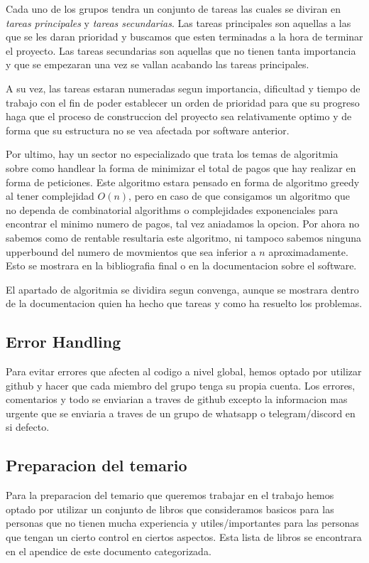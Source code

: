 \documentclass{article}
\theoremstyle{definition}
\begin{document}
Cada uno de los grupos tendra un conjunto de tareas las cuales se diviran en \textit{tareas principales} y \textit{tareas secundarias}. Las tareas principales son aquellas a las que se les daran prioridad y buscamos que esten terminadas a la hora de terminar el proyecto. Las tareas secundarias son aquellas que no tienen tanta importancia y que se empezaran una vez se vallan acabando las tareas principales.

A su vez, las tareas estaran numeradas segun importancia, dificultad y tiempo de trabajo con el fin de poder establecer un orden de prioridad para que su progreso haga que el proceso de construccion del proyecto sea relativamente optimo y de forma que su estructura no se vea afectada por software anterior.

Por ultimo, hay un sector no especializado que trata los temas de algoritmia sobre como handlear la forma de minimizar el total de pagos que hay realizar en forma de peticiones. Este algoritmo estara pensado en forma de algoritmo greedy al tener complejidad $O(n)$, pero en caso de que consigamos un algoritmo que no dependa de combinatorial algorithms o complejidades exponenciales para encontrar el minimo numero de pagos, tal vez aniadamos la opcion. Por ahora no sabemos como de rentable resultaria este algoritmo, ni tampoco sabemos ninguna upperbound del numero de movmientos que sea inferior a $n$ aproximadamente. Esto se mostrara en la bibliografia final o en la documentacion sobre el software.

El apartado de algoritmia se dividira segun convenga, aunque se mostrara dentro de la documentacion quien ha hecho que tareas y como ha resuelto los problemas.
\subsection{Error Handling}

Para evitar errores que afecten al codigo a nivel global, hemos optado por utilizar github y hacer que cada miembro del grupo tenga su propia cuenta. Los errores, comentarios y todo se enviarian a traves de github excepto la informacion mas urgente que se enviaria a traves de un grupo de whatsapp o telegram/discord en si defecto.

\subsection{Preparacion del temario}

Para la preparacion del temario que queremos trabajar en el trabajo hemos optado por utilizar un conjunto de libros que consideramos basicos para las personas que no tienen mucha experiencia y utiles/importantes para las personas que tengan un cierto control en ciertos aspectos. Esta lista de libros se encontrara en el apendice de este documento categorizada.
\end{document}

